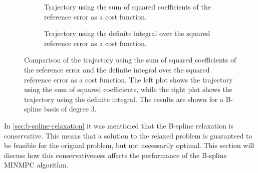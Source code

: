 \begin{figure}
    \centering
    \begin{subfigure}[b]{\textwidth}
        \centering
        
        \caption{Trajectory using the sum of squared coefficients of the reference error as a cost function.}
        \label{fig:conservativeness-traj-coeffs}
    \end{subfigure}
    \hfill
    \begin{subfigure}[b]{\textwidth}
        \centering
        
        \caption{Trajectory using the definite integral over the squared reference error as a cost function.}
        \label{fig:conservativeness-traj-integral}
    \end{subfigure}
    \caption{Comparison of the trajectory using the sum of squared coefficients of the reference error and the definite integral over the squared reference error as a cost function. The left plot shows the trajectory using the sum of squared coefficients, while the right plot shows the trajectory using the definite integral. The results are shown for a B-spline basis of degree 3.}
    \label{fig:conservativeness-traj}
\end{figure}

\label{sec:conservativeness}
In \cref{sec:b-spline-relaxation} it was mentioned that the B-spline relaxation is conservative. This means that a solution to the relaxed problem is guaranteed to be feasible for the original problem, but not necessarily optimal. This section will discuss how this conservativeness affects the performance of the B-spline MINMPC algorithm.

